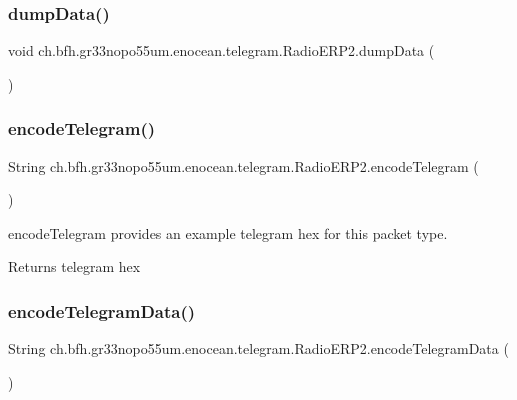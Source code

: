 \subsubsection{\texorpdfstring{dump\+Data()}{dumpData()}}
{\footnotesize\ttfamily void ch.\+bfh.\+gr33nopo55um.\+enocean.\+telegram.\+Radio\+E\+R\+P2.\+dump\+Data (\begin{DoxyParamCaption}{ }\end{DoxyParamCaption})}

\hypertarget{classch_1_1bfh_1_1gr33nopo55um_1_1enocean_1_1telegram_1_1_radio_e_r_p2_ab3af9bd9ec0c29560f3200523312f34d}{}\label{classch_1_1bfh_1_1gr33nopo55um_1_1enocean_1_1telegram_1_1_radio_e_r_p2_ab3af9bd9ec0c29560f3200523312f34d} 
\subsubsection{\texorpdfstring{encode\+Telegram()}{encodeTelegram()}}
{\footnotesize\ttfamily String ch.\+bfh.\+gr33nopo55um.\+enocean.\+telegram.\+Radio\+E\+R\+P2.\+encode\+Telegram (\begin{DoxyParamCaption}{ }\end{DoxyParamCaption})}

encode\+Telegram provides an example telegram hex for this packet type.

\begin{DoxyReturn}{Returns}
telegram hex 
\end{DoxyReturn}
\hypertarget{classch_1_1bfh_1_1gr33nopo55um_1_1enocean_1_1telegram_1_1_radio_e_r_p2_a23c8249da06defacc330050b493cfdc3}{}\label{classch_1_1bfh_1_1gr33nopo55um_1_1enocean_1_1telegram_1_1_radio_e_r_p2_a23c8249da06defacc330050b493cfdc3} 
\subsubsection{\texorpdfstring{encode\+Telegram\+Data()}{encodeTelegramData()}}
{\footnotesize\ttfamily String ch.\+bfh.\+gr33nopo55um.\+enocean.\+telegram.\+Radio\+E\+R\+P2.\+encode\+Telegram\+Data (\begin{DoxyParamCaption}{ }\end{DoxyParamCaption})}

